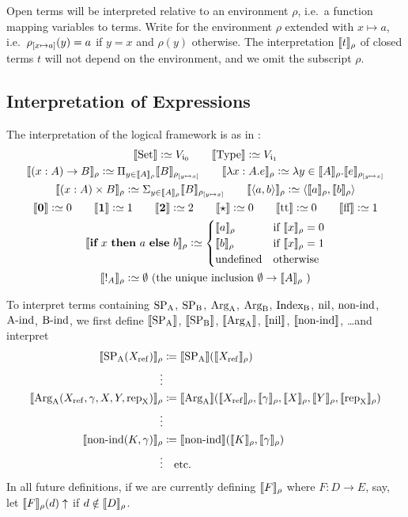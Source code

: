 \documentclass{article}
\begin{document}
Open terms will be interpreted relative to an environment $\rho$, i.e.\ a
function mapping variables to terms. Write  for the
environment $\rho$ extended with $x \mapsto a$, i.e.\ $\rhoextend{x}{a}(y) = a$
if $y = x$ and $\rho(y)$ otherwise. The interpretation $\sem{t}_{\rho}$ of closed
terms $t$ will not depend on the environment, and we omit the subscript $\rho$.

\subsection{Interpretation of Expressions}
\noindent 
The interpretation of the logical framework is as in
\cite{dybjersetzer1999finax}:
\begin{gather*}
\sem{\Set} \colonsimeq V_{\cardz} \qquad \sem{\TYPE} \colonsimeq V_{\cardi} \\
\sem{(x : A) \to B}_\rho \colonsimeq \Pi_{y \in
  \sem{A}_\rho}\sem{B}_{\rhoextend{y}{x}} \qquad
\sem{\lambda x:A.e}_\rho \colonsimeq \lambda y \in
\sem{A}_\rho.\sem{e}_{\rhoextend{y}{x}} \\
\sem{(x : A) \times B}_\rho \colonsimeq \Sigma_{y \in
  \sem{A}_\rho}\sem{B}_{\rhoextend{y}{x}} \qquad
\sem{\langle a, b \rangle}_\rho \colonsimeq \langle \sem{a}_\rho ,
\sem{b}_\rho\rangle \\
\sem{\zero} \colonsimeq 0 \qquad \sem{\one} \colonsimeq 1 \qquad
\sem{\two} \colonsimeq 2 \qquad \sem{\oneelt} \colonsimeq 0 \qquad \sem{\twott} \colonsimeq 0 \qquad
\sem{\twoff} \colonsimeq 1\\
\sem{\IF~x~\THEN~a~\ELSE~b}_\rho \colonsimeq
\begin{cases}
\sem{a}_\rho & \text{if $\sem{x}_\rho = 0$} \\
\sem{b}_\rho & \text{if $\sem{x}_\rho = 1$} \\
\text{undefined} & \text{otherwise} \\
\end{cases} \\
\sem{!_A}_\rho \colonsimeq \emptyset \text{ (the unique inclusion $\emptyset \to \sem{A}_\rho$ )}
\end{gather*}

To interpret terms containing $\SPA$, $\SPB$, $\ArgA$, $\ArgB$, $\IndexB$, 
$\nilA$, $\nonindA$, $\AindA$, $\BindA$, we first define $\sem{\SPA}$,
$\sem{\SPB}$, $\sem{\ArgA}$, $\sem{\nilA}$, $\sem{\nonindA}$, \ldots and interpret
\begin{align*}
\sem{\SPA(\Xref)}_\rho &\coloneqq \sem{\SPA}(\sem{\Xref}_\rho) \\
\vdots \\
\sem{\ArgA(\Xref, \gamma, X, Y, \repA)}_\rho &\coloneqq
\sem{\ArgA}(\sem{\Xref}_\rho, \sem{\gamma}_\rho, \sem{X}_\rho, \sem{Y}_\rho, \sem{\repA}_\rho) \\
\vdots \\
\sem{\nonindA(K, \gamma)}_\rho &\coloneqq \sem{\nonindA}(\sem{K}_\rho,
\sem{\gamma}_\rho) \\
\vdots & \text{\quad etc.}
\end{align*}
In all future definitions, if we are currently defining $\sem{F}_{\rho}$ where $F : D
\to E$, say, let $\sem{F}_{\rho}(d)\uparrow$ if $d \notin \sem{D}_{\rho}$.
\end{document}
